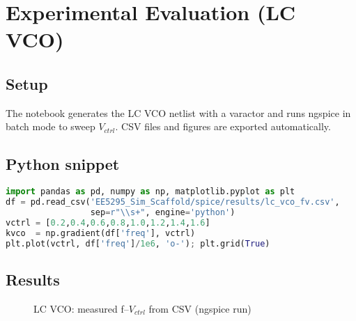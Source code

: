 \section{Experimental Evaluation (LC VCO)}
\subsection*{Setup}
The notebook generates the LC VCO netlist with a varactor and runs ngspice in batch mode to sweep \(V_{ctrl}\). CSV files and figures are exported automatically.

\subsection*{Python snippet}
\begin{lstlisting}[language=Python]
import pandas as pd, numpy as np, matplotlib.pyplot as plt
df = pd.read_csv('EE5295_Sim_Scaffold/spice/results/lc_vco_fv.csv',
                 sep=r"\\s+", engine='python')
vctrl = [0.2,0.4,0.6,0.8,1.0,1.2,1.4,1.6]
kvco  = np.gradient(df['freq'], vctrl)
plt.plot(vctrl, df['freq']/1e6, 'o-'); plt.grid(True)
\end{lstlisting}

\subsection*{Results}
\begin{figure}[H]
  \centering
  \caption{LC VCO: measured f--$V_{ctrl}$ from CSV (ngspice run)}
\end{figure}


